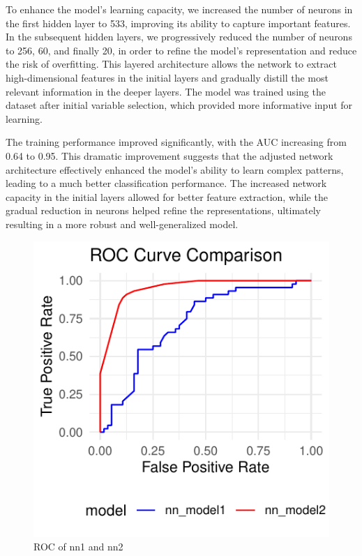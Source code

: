 \documentclass[
  12pt,
  letterpaper,
  DIV=11,
  numbers=noendperiod]{scrartcl}
\begin{document}
To enhance the model's learning capacity, we increased the number of
neurons in the first hidden layer to 533, improving its ability to
capture important features. In the subsequent hidden layers, we
progressively reduced the number of neurons to 256, 60, and finally 20,
in order to refine the model's representation and reduce the risk of
overfitting. This layered architecture allows the network to extract
high-dimensional features in the initial layers and gradually distill
the most relevant information in the deeper layers. The model was
trained using the dataset after initial variable selection, which
provided more informative input for learning.

The training performance improved significantly, with the AUC increasing
from 0.64 to 0.95. This dramatic improvement suggests that the adjusted
network architecture effectively enhanced the model's ability to learn
complex patterns, leading to a much better classification performance.
The increased network capacity in the initial layers allowed for better
feature extraction, while the gradual reduction in neurons helped refine
the representations, ultimately resulting in a more robust and
well-generalized model.

\begin{figure}[H]

{\centering \includegraphics{me_files/figure-pdf/nnROC-1.pdf}

}

\caption{ROC of nn1 and nn2}

\end{figure}%
\end{document}
